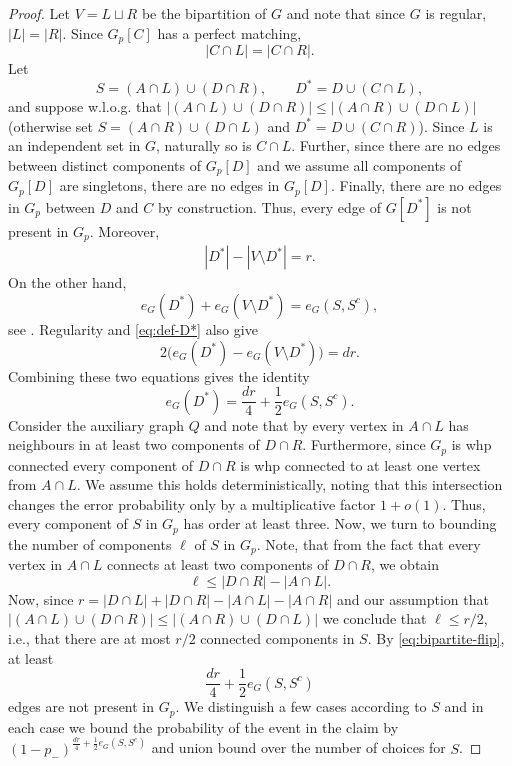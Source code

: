 \documentclass[10pt,a4paper]{article}
\begin{document}
\begin{proof}
Let $V=L\sqcup R$ be the bipartition of $G$ and note that since $G$ is regular, $|L|=|R|$. Since $G_p[C]$ has a perfect matching,
\[
 |C\cap L|=|C\cap R|.
\]
Let
\[
 S=(A\cap L)\cup(D\cap R), \qquad D^*=D\cup(C\cap L),
\]
and suppose w.l.o.g. that $|(A\cap L)\cup(D\cap R)| \leq |(A\cap R)\cup(D\cap L)|$ (otherwise set $S=(A \cap R) \cup (D \cap L)$ and $D^*=D \cup (C \cap R)$).
Since $L$ is an independent set in $G$, naturally so is $C\cap L$. Further, since there are no edges between distinct components of $G_p[D]$ and we assume all components of $G_p[D]$ are singletons, there are no edges in $G_p[D]$. Finally, there are no edges in $G_p$ between $D$ and $C$ by construction. Thus, every edge of $G[D^*]$ is not present in $G_p$. 
Moreover,
\begin{align} \label{eq:def-D*}
     |D^*|-|V\setminus D^*|=r.
\end{align}
On the other hand,
\[
 e_G(D^*)+e_G(V\setminus D^*)=e_G(S,S^c),
\]
see .
Regularity and \eqref{eq:def-D*} also give
\[
 2\bigl(e_G(D^*)-e_G(V\setminus D^*)\bigr)=dr.
\]
Combining these two equations gives the identity
\begin{equation}\label{eq:bipartite-flip}
 e_G(D^*)=\frac{dr}{4}+\frac12e_G(S,S^c).
\end{equation}
Consider the auxiliary graph $Q$ and note that by  every vertex in $A \cap L$ has neighbours in at least two components of $D\cap R$.
Furthermore, since $G_p$ is whp connected every component of $D\cap R$ is whp connected to at least one vertex from $A \cap L$. We assume this holds deterministically, noting that this intersection changes the error probability only by a multiplicative factor $1+o(1)$. Thus, every component of $S$ in $G_p$ has order at least three. Now, we turn to bounding the number of components $\ell$ of $S$ in $G_p$. Note, that from the fact that every vertex in $A \cap L$ connects at least two components of $D\cap R$, we obtain
\[
\ell \leq |D \cap R|-|A \cap L|.
\]
Now, since $r=|D \cap L| + |D \cap R| - |A \cap L| - |A \cap R|$ and our assumption that $|(A\cap L)\cup(D\cap R)| \leq |(A\cap R)\cup(D\cap L)|$ we conclude that $\ell \leq r/2$, i.e., that there are at most $r/2$ connected components in $S$. By \eqref{eq:bipartite-flip}, at least
\[
\frac{dr}{4} + \frac{1}{2} e_G(S, S^c)
\]
edges are not present in $G_p$. We distinguish a few cases according to $S$ and in each case we bound the probability of the event in the claim by $(1-p_-)^{\frac{dr}{4} + \frac{1}{2} e_G(S, S^c)}$ and union bound over the number of choices for $S$.


\end{proof}
\end{document}

